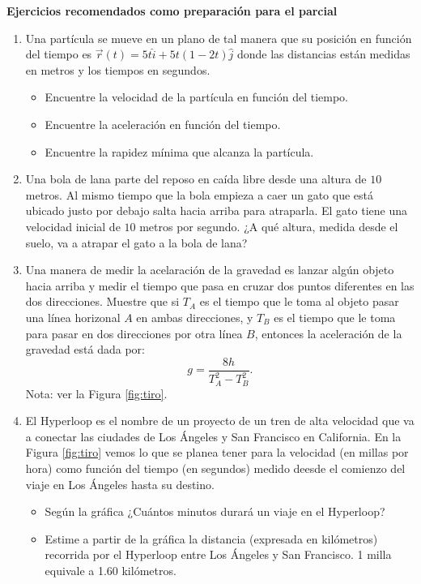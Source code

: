 \documentclass[letterpaper,10pt,onecolumn]{article}
\begin{document}
\newpage

{\bf Ejercicios recomendados como preparaci\'on para el parcial}\\

\begin{enumerate}
\item Una part\'icula se mueve en un plano de tal manera que su
  posici\'on en funci\'on del tiempo es $\vec{r}(t)= 5t\hat{i} +
  5t(1-2t)\hat{j}$ donde las distancias est\'an medidas en metros y
  los tiempos en segundos. 

\begin{itemize}
\item Encuentre la velocidad de la part\'icula en funci\'on
  del tiempo. 
\item  Encuentre la aceleraci\'on en funci\'on del tiempo. 
\item Encuentre la rapidez m\'inima que alcanza la
  part\'icula.   
\end{itemize}

\item Una bola de lana parte del reposo en ca\'ida libre
  desde una altura de $10$ metros. Al mismo tiempo que la bola empieza a caer un gato que est\'a ubicado justo por debajo salta hacia arriba para atraparla. El gato tiene una
  velocidad inicial de $10$ metros por segundo. ¿A qu\'e altura, medida desde el suelo, va a atrapar el gato a la bola de lana?

\item Una manera de medir la acelaraci\'on de la gravedad es lanzar
  alg\'un objeto hacia arriba y medir el tiempo que pasa en cruzar dos
  puntos diferentes en las dos direcciones. Muestre que si 
  $T_A$ es el tiempo que le toma al objeto pasar una l\'inea horizonal
  $A$ en ambas direcciones, y $T_B$ es el tiempo que le toma para pasar en dos
  direcciones por   otra l\'inea $B$, entonces la aceleraci\'on de la
  gravedad est\'a dada por:
  \begin{displaymath}
    g = \frac{8h}{T_A^2 -T_B^2}.
  \end{displaymath}
  Nota: ver la Figura \ref{fig:tiro}. 

\item El Hyperloop es el nombre de un proyecto de un tren de alta velocidad que va a conectar las ciudades de Los \'Angeles y San Francisco en California. En la Figura \ref{fig:tiro} vemos lo que se planea tener para la velocidad (en millas por hora) como funci\'on del tiempo (en segundos) medido deesde el comienzo del viaje en Los \'Angeles hasta su destino. 
\begin{itemize}
\item Seg\'un la gr\'afica ¿Cu\'antos minutos durar\'a un
  viaje en el Hyperloop? 
\item Estime a partir de la gr\'afica la distancia (expresada en kil\'ometros) recorrida por el Hyperloop entre Los \'Angeles y San Francisco.  1 milla equivale a 1.60 kil\'ometros. 
\end{itemize}

\end{enumerate}
\end{document}
